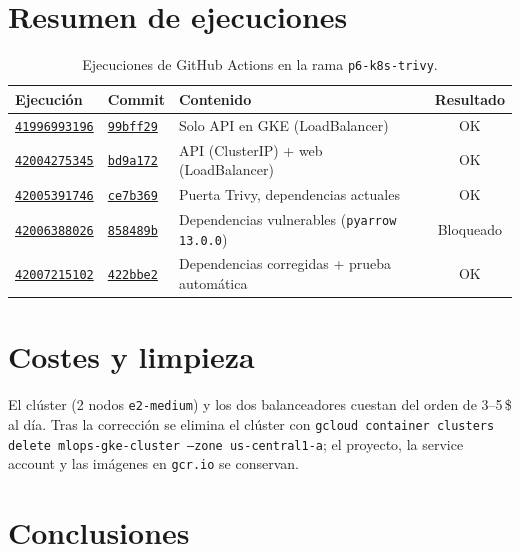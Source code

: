 \documentclass[11pt,a4paper]{article}
\newcommand{\code}[1]{\texttt{#1}}
\newcommand{\run}[1]{\href{https://github.com/JES0406/mlops-practica-icai/actions/runs/#1}{\code{#1}}}
\newcommand{\commit}[1]{\href{https://github.com/JES0406/mlops-practica-icai/commit/#1}{\code{#1}}}
\begin{document}
\section{Resumen de ejecuciones}

\begin{table}[h]
\centering
\begin{tabularx}{\textwidth}{l l X c}
\toprule
Ejecución & Commit & Contenido & Resultado \\
\midrule
\run{41996993196} & \commit{99bff29} & Solo API en GKE (LoadBalancer) & \textcolor{okgreen}{OK} \\
\run{42004275345} & \commit{bd9a172} & API (ClusterIP) + web (LoadBalancer) & \textcolor{okgreen}{OK} \\
\run{42005391746} & \commit{ce7b369} & Puerta Trivy, dependencias actuales & \textcolor{okgreen}{OK} \\
\run{42006388026} & \commit{858489b} & Dependencias vulnerables (\code{pyarrow 13.0.0}) & \textcolor{badred}{Bloqueado} \\
\run{42007215102} & \commit{422bbe2} & Dependencias corregidas + prueba automática & \textcolor{okgreen}{OK} \\
\bottomrule
\end{tabularx}
\caption{Ejecuciones de GitHub Actions en la rama \code{p6-k8s-trivy}.}
\label{tab:runs}
\end{table}

\section{Costes y limpieza}

El clúster (2 nodos \code{e2-medium}) y los dos balanceadores cuestan del orden de
3--5\,\$ al día. Tras la corrección se elimina el clúster con
\code{gcloud container clusters delete mlops-gke-cluster --zone us-central1-a}; el
proyecto, la service account y las imágenes en \code{gcr.io} se conservan.

\section{Conclusiones}
\end{document}

